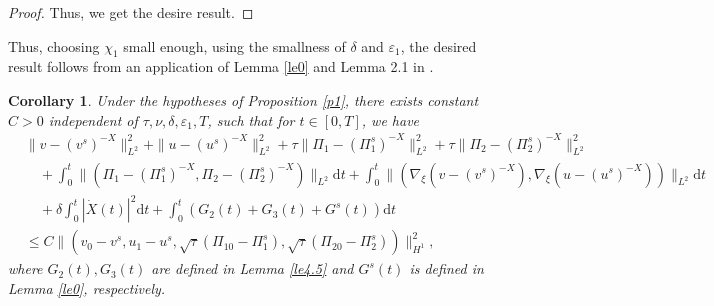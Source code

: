 \documentclass[10pt,reqno]{amsart}
\numberwithin{equation}{section}
\newtheorem{corollary}[theorem]{Corollary}
\newcommand{\dif}{\mathrm{d}}
\begin{document}
\begin{proof}
Thus, we get the desire result.


\end{proof}


Thus, choosing $\chi_1$ small enough, using the smallness of $\delta$ and $\varepsilon_1$, the desired result follows from an application of Lemma \ref{le0} and Lemma 2.1 in \cite{WY}.
\begin{corollary} \label{coro111}
	Under the hypotheses of Proposition \ref{p1}, there exists constant $C>0$ independent of $\tau, \nu, \delta, \varepsilon_1, T$, such that for $t\in[0, T]$, we have
	\begin{equation}\label{hsgjcoll}
		\begin{aligned}
			&\|v-(v^s)^{-X}\|_{L^2}^2+\|u-(u^s)^{-X}\|_{L^2}^2
			+\tau\|\Pi_1-(\Pi_1^s)^{-X}\|_{L^2}^2
			+\tau\|\Pi_2-(\Pi_2^s)^{-X}\|_{L^2}^2\\
			&\quad
			+\int_0^t\|(\Pi_1-(\Pi_1^s)^{-X}, \Pi_2-(\Pi_2^s)^{-X})\|_{L^2}\dif t
			+\int_0^t\|(\nabla_\xi(v-(v^s)^{-X}), \nabla_\xi(u-(u^s)^{-X}))\|_{L^2}\dif t\\
			&\quad+\delta\int_0^t|\dot{X}(t)|^2
			\dif t+\int_0^t(G_2(t)+G_3(t)+G^s(t))
			\dif t\\
			&\le
			C\|(v_{0}-v^s, u_1-u^s,
			\sqrt{\tau}(\Pi_{10}-\Pi_1^s), \sqrt{\tau}(\Pi_{20}-\Pi_2^s))\|_{H^1}^2,
		\end{aligned}
	\end{equation}
	where $G_2(t), G_3(t)$ are defined in Lemma \ref{le4.5} and $G^s(t)$ is defined in Lemma \ref{le0}, respectively.
\end{corollary}
\end{document}
